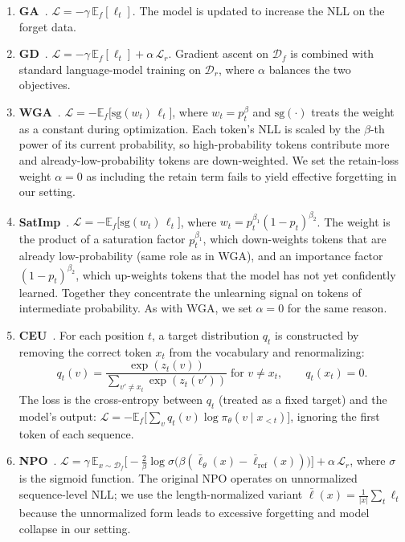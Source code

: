 \begin{enumerate}
\item \textbf{GA}~\citep{jang2022knowledge}. $\mathcal{L} = -\gamma\,\mathbb{E}_f[\ell_t]$. The model is updated to increase the NLL on the forget data.

\item \textbf{GD}~\citep{maini2024tofu}. $\mathcal{L} = -\gamma\,\mathbb{E}_f[\ell_t] + \alpha\,\mathcal{L}_r$. Gradient ascent on $\mathcal{D}_f$ is combined with standard language-model training on $\mathcal{D}_r$, where $\alpha$ balances the two objectives.

\item \textbf{WGA}~\citep{wang2025wga}. $\mathcal{L} = -\mathbb{E}_f\!\big[\mathrm{sg}(w_t)\,\ell_t\big]$, where $w_t = p_t^{\beta}$ and $\mathrm{sg}(\cdot)$ treats the weight as a constant during optimization. Each token's NLL is scaled by the $\beta$-th power of its current probability, so high-probability tokens contribute more and already-low-probability tokens are down-weighted. We set the retain-loss weight $\alpha=0$ as including the retain term fails to yield effective forgetting in our setting.

\item \textbf{SatImp}~\citep{yang2025satimp}. $\mathcal{L} = -\mathbb{E}_f\!\big[\mathrm{sg}(w_t)\,\ell_t\big]$, where $w_t = p_t^{\beta_1}(1-p_t)^{\beta_2}$. The weight is the product of a saturation factor $p_t^{\beta_1}$, which down-weights tokens that are already low-probability (same role as in WGA), and an importance factor $(1-p_t)^{\beta_2}$, which up-weights tokens that the model has not yet confidently learned. Together they concentrate the unlearning signal on tokens of intermediate probability. As with WGA, we set $\alpha=0$ for the same reason.

\item \textbf{CEU}~\citep{yang2025ceu}. For each position $t$, a target distribution $q_t$ is constructed by removing the correct token $x_t$ from the vocabulary and renormalizing:
\begin{equation*}
q_t(v) = \frac{\exp(z_t(v))}{\sum_{v'\neq x_t}\exp(z_t(v'))}\;\text{for } v \neq x_t,\qquad q_t(x_t)=0.
\end{equation*}
The loss is the cross-entropy between $q_t$ (treated as a fixed target) and the model's output: $\mathcal{L} = -\mathbb{E}_f\!\big[\sum_v q_t(v)\log\pi_\theta(v\mid x_{<t})\big]$, ignoring the first token of each sequence.

\item \textbf{NPO}~\citep{zhang2024npo}. $\mathcal{L} = \gamma\,\mathbb{E}_{x\sim\mathcal{D}_f}\!\Big[-\tfrac{2}{\beta}\log\sigma\!\big(\beta(\bar\ell_\theta(x)-\bar\ell_{\mathrm{ref}}(x))\big)\Big]+\alpha\,\mathcal{L}_r$, where $\sigma$ is the sigmoid function. The original NPO operates on unnormalized sequence-level NLL; we use the length-normalized variant $\bar\ell(x)=\frac{1}{|x|}\sum_t\ell_t$ because the unnormalized form leads to excessive forgetting and model collapse in our setting.


\end{enumerate}
